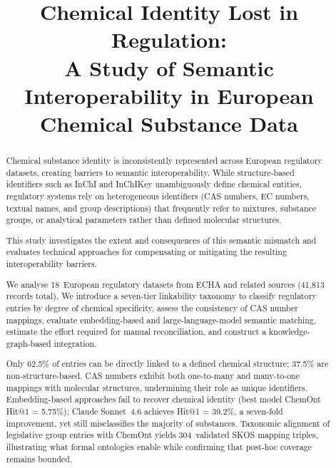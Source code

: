\begin{frontmatter}              %


\title{Chemical Identity Lost in Regulation\@:\\A Study of Semantic Interoperability in European Chemical Substance Data}



\begin{abstract}

Chemical substance identity is inconsistently represented across European regulatory datasets, creating barriers to semantic interoperability. While structure-based identifiers such as InChI and InChIKey unambiguously define chemical entities, regulatory systems rely on heterogeneous identifiers (CAS numbers, EC numbers, textual names, and group descriptions) that frequently refer to mixtures, substance groups, or analytical parameters rather than defined molecular structures.

This study investigates the extent and consequences of this semantic mismatch and evaluates technical approaches for compensating or mitigating the resulting interoperability barriers.

We analyse 18~European regulatory datasets from ECHA and related sources (41,813 records total). We introduce a seven-tier linkability taxonomy to classify regulatory entries by degree of chemical specificity, assess the consistency of CAS number mappings, evaluate embedding-based and large-language-model semantic matching, estimate the effort required for manual reconciliation, and construct a knowledge-graph-based integration.

Only 62.5\% of entries can be directly linked to a defined chemical structure; 37.5\% are non-structure-based. CAS numbers exhibit both one-to-many and many-to-one mappings with molecular structures, undermining their role as unique identifiers. Embedding-based approaches fail to recover chemical identity (best model ChemOnt Hit@1 = 5.75\%); Claude Sonnet~4.6 achieves Hit@1 = 39.2\%, a seven-fold improvement, yet still misclassifies the majority of substances. Taxonomic alignment of legislative group entries with ChemOnt yields 304~validated SKOS mapping triples, illustrating what formal ontologies enable while confirming that post-hoc coverage remains bounded.


\end{abstract}
\end{frontmatter}
